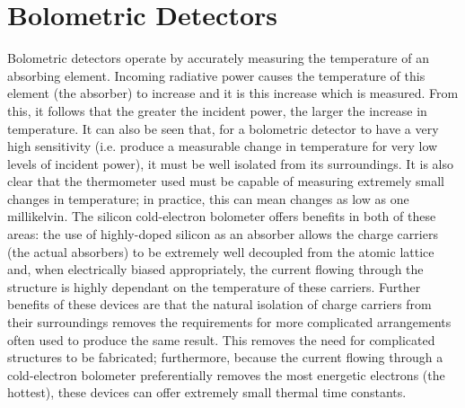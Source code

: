 \section{Bolometric Detectors}\label{sec:bolometers}
Bolometric detectors operate by accurately measuring the temperature of an absorbing element. Incoming radiative power causes the temperature of this element (the absorber) to increase and it is this increase which is measured. From this, it follows that the greater the incident power, the larger the increase in temperature. It can also be seen that, for a bolometric detector to have a very high sensitivity (i.e. produce a measurable change in temperature for very low levels of incident power), it must be well isolated from its surroundings. It is also clear that the thermometer used must be capable of measuring extremely small changes in temperature;  in practice, this can mean changes as low as one millikelvin. The silicon cold-electron bolometer offers benefits in both of these areas: the use of highly-doped silicon as an absorber allows the charge carriers (the actual absorbers) to be extremely well decoupled from the atomic lattice and, when electrically biased appropriately, the current flowing through the structure is highly dependant on the temperature of these carriers. Further benefits of these devices are that the natural isolation of charge carriers from their surroundings removes the requirements for more complicated arrangements often used to produce the same result. This removes the need for complicated structures to be fabricated; furthermore, because the current flowing through a cold-electron bolometer preferentially removes the most energetic electrons (the hottest), these devices can offer extremely small thermal time constants.


